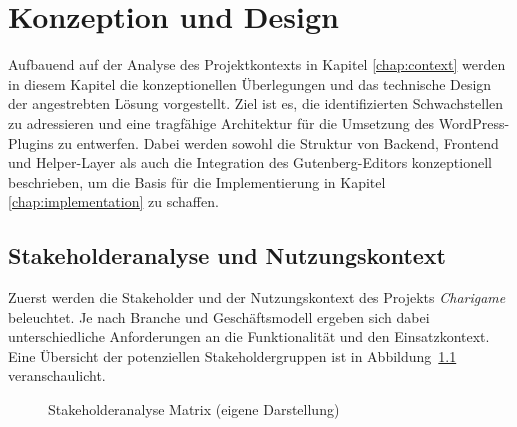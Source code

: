 \chapter{Konzeption und Design}
\label{chap:concept}
Aufbauend auf der Analyse des Projektkontexts in Kapitel \ref{chap:context} werden in diesem Kapitel die konzeptionellen Überlegungen und das technische Design der angestrebten Lösung vorgestellt.
Ziel ist es, die identifizierten Schwachstellen zu adressieren und eine tragfähige Architektur für die Umsetzung des WordPress-Plugins zu entwerfen.
Dabei werden sowohl die Struktur von Backend, Frontend und Helper-Layer als auch die Integration des Gutenberg-Editors konzeptionell beschrieben, um die Basis für die Implementierung in Kapitel \ref{chap:implementation} zu schaffen.
\section{Stakeholderanalyse und Nutzungskontext}
Zuerst werden die Stakeholder und der Nutzungskontext des Projekts \textit{Charigame} beleuchtet.
Je nach Branche und Geschäftsmodell ergeben sich dabei unterschiedliche Anforderungen an die Funktionalität und den Einsatzkontext.
Eine Übersicht der potenziellen Stakeholdergruppen ist in Abbildung~\ref{fig:stakeholder} veranschaulicht.
\begin{figure}[H]
    \centering
    
    \caption{Stakeholderanalyse Matrix (eigene Darstellung)}
    \label{fig:stakeholder}
\end{figure}

